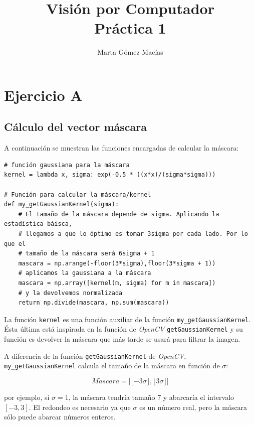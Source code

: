 \documentclass[11pt,a4paper]{article}
\title{\Huge{Visión por Computador} \\ Práctica 1}
\author{Marta Gómez Macías}
\theoremstyle{plain}
\theoremstyle{definition}
\begin{document}
\maketitle

\tableofcontents

\section{Ejercicio A}
\subsection{Cálculo del vector máscara}

A continuación se muestran las funciones encargadas de calcular la máscara:

\begin{verbatim}
# función gaussiana para la máscara
kernel = lambda x, sigma: exp(-0.5 * ((x*x)/(sigma*sigma)))

# Función para calcular la máscara/kernel
def my_getGaussianKernel(sigma):
    # El tamaño de la máscara depende de sigma. Aplicando la estadística báisca, 
    # llegamos a que lo óptimo es tomar 3sigma por cada lado. Por lo que el 
    # tamaño de la máscara será 6sigma + 1
    mascara = np.arange(-floor(3*sigma),floor(3*sigma + 1))
    # aplicamos la gaussiana a la máscara
    mascara = np.array([kernel(m, sigma) for m in mascara])
    # y la devolvemos normalizada
    return np.divide(mascara, np.sum(mascara))
\end{verbatim}

La función \texttt{kernel} es una función auxiliar de la función \texttt{my\_getGaussianKernel}. Ésta última está inspirada en la función de \textit{OpenCV} \texttt{getGaussianKernel} y su función es devolver la máscara que más tarde se usará para filtrar la imagen.

A diferencia de la función \texttt{getGaussianKernel} de \textit{OpenCV}, \texttt{my\_getGaussianKernel} calcula el tamaño de la máscara en función de $\sigma$:

\begin{displaymath}
 M\acute{a}scara = \bigg[\lfloor-3\sigma\rfloor,\lfloor3\sigma\rfloor\bigg]
\end{displaymath}

por ejemplo, si $\sigma = 1$, la máscara tendría tamaño 7 y abarcaría el intervalo $[-3,3]$. El redondeo es necesario ya que $\sigma$ es un número real, pero la máscara sólo puede abarcar números enteros.
\end{document}

